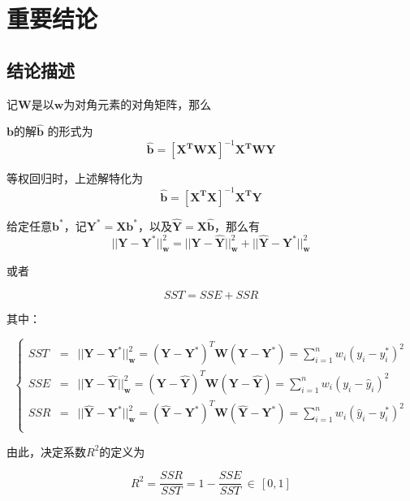 \section{重要结论}

\subsection{结论描述}

记$\bm{W}$是以$\bm{w}$为对角元素的对角矩阵，那么

\begin{mingti}\label{mingti_lr_sol}
    $\bm{b}$的解$\bm{\hat{b}}$ 的形式为
    \begin{equation}\label{eq_lr_hat_b_sol}
        \bm{\hat{b}} = [\bm{X^TWX}]^{-1}\bm{X^TWY}
    \end{equation}

    等权回归时，上述解特化为
    \begin{equation}
        \bm{\hat{b}} = [\bm{X^TX}]^{-1}\bm{X^TY}
    \end{equation}
\end{mingti}

\begin{mingti}\label{mingti_lr_sum_square}
    给定任意$\bm{b^*}$，记$\bm{Y^*}=\bm{Xb^*}$，以及$\bm{\hat{Y}}=\bm{X\hat{b}}$，那么有
    \begin{equation}
        ||\bm{Y} - \bm{Y^*}||_{\bm{w}}^2 = ||\bm{Y} - \bm{\hat{Y}}||_{\bm{w}}^2 + ||\bm{\hat{Y}} - \bm{Y^*}||_{\bm{w}}^2
    \end{equation}

    或者

    \begin{equation}
        SST = SSE + SSR
    \end{equation}

    其中：

    \begin{equation}
        \left\{
        \begin{array}{rcl}
            SST & = & ||\bm{Y} - \bm{Y^*}||_{\bm{w}}^2 = (\bm{Y} - \bm{Y^*})^T\bm{W}(\bm{Y} - \bm{Y^*}) = \sum_{i=1}^nw_i(y_i-y_i^*)^2                           \\
            SSE & = & ||\bm{Y} - \bm{\hat{Y}}||_{\bm{w}}^2 = (\bm{Y} - \bm{\hat{Y}})^T\bm{W}(\bm{Y} - \bm{\hat{Y}})  = \sum_{i=1}^nw_i(y_i-\hat{y}_i)^2          \\
            SSR & = & ||\bm{\hat{Y}} - \bm{Y^*}||_{\bm{w}}^2 = (\bm{\hat{Y}} - \bm{Y^*})^T\bm{W}(\bm{\hat{Y}} - \bm{Y^*}) = \sum_{i=1}^nw_i(\hat{y}_i - y_i^*)^2 \\
        \end{array}
        \right.
    \end{equation}

    由此，决定系数$R^2$的定义为

    \begin{equation}
        R^2 = \frac{SSR}{SST} =  1 - \frac{SSE}{SST} \, \in \, [0, 1]
    \end{equation}
\end{mingti}

